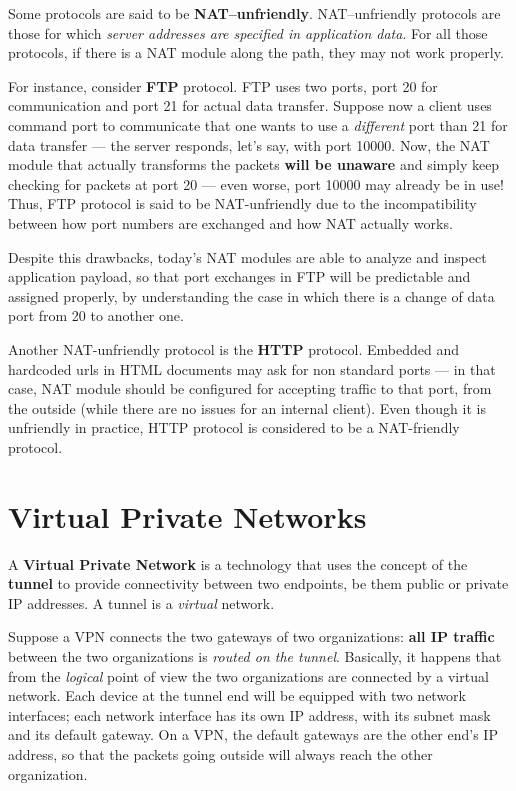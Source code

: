 \documentclass[10pt]{extreport}
\begin{document}
Some protocols are said to be \textbf{NAT--unfriendly}. NAT--unfriendly
protocols are those for which \emph{server addresses are specified in
application data}. For all those protocols, if there is a NAT module along the
path, they may not work properly.

For instance, consider \textbf{FTP} protocol. FTP uses two ports, port 20 for
communication and port 21 for actual data transfer. Suppose now a client uses
command port to communicate that one wants to use a \emph{different} port than
21 for data transfer --- the server responds, let's say, with port 10000. Now,
the NAT module that actually transforms the packets \textbf{will be unaware}
and simply keep checking for packets at port 20 --- even worse, port 10000 may
already be in use! Thus, FTP protocol is said to be NAT-unfriendly due to the
incompatibility between how port numbers are exchanged and how NAT actually
works.

Despite this drawbacks, today's NAT modules are able to analyze and inspect
application payload, so that port exchanges in FTP will be predictable and
assigned properly, by understanding the case in which there is a change of data
port from 20 to another one.

Another NAT-unfriendly protocol is the \textbf{HTTP} protocol. Embedded and
hardcoded urls in HTML documents may ask for non standard ports --- in that
case, NAT module should be configured for accepting traffic to that port, from
the outside (while there are no issues for an internal client). Even though it
is unfriendly in practice, HTTP protocol is considered to be a NAT-friendly
protocol.

\chapter{Virtual Private Networks}

A \textbf{Virtual Private Network} is a technology that uses the concept of the
\textbf{tunnel} to provide connectivity between two endpoints, be them public
or private IP addresses. A tunnel is a \emph{virtual} network.

Suppose a VPN connects the two gateways of two organizations: \textbf{all IP
traffic} between the two organizations is \emph{routed on the tunnel}.
Basically, it happens that from the \emph{logical} point of view the two
organizations are connected by a virtual network. Each device at the tunnel end
will be equipped with two network interfaces; each network interface has its
own IP address, with its subnet mask and its default gateway. On a VPN, the
default gateways are the other end's IP address, so that the packets going
outside will always reach the other organization.
\end{document}
